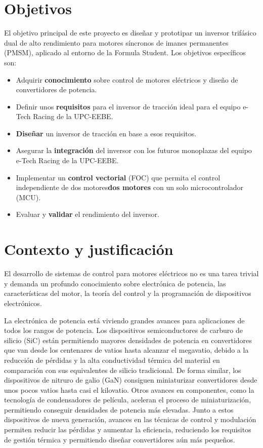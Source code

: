 \section{Objetivos}
El objetivo principal de este proyecto es diseñar y prototipar un inversor trifásico dual de alto rendimiento para motores síncronos de imanes permanentes (PMSM), aplicado al entorno de la Formula Student. Los objetivos específicos son:

\begin{itemize}
	\item Adquirir \textbf{conocimiento} sobre control de motores eléctricos y diseño de convertidores de potencia.
	\item Definir unos \textbf{requisitos} para el inversor de tracción ideal para el equipo e-Tech Racing de la UPC-EEBE.
	\item \textbf{Diseñar} un inversor de tracción en base a esos requisitos.
	\item Asegurar la \textbf{integración} del inversor con los futuros monoplazas del equipo e-Tech Racing de la UPC-EEBE.
	\item Implementar un \textbf{control vectorial} (FOC) que permita el control independiente de dos motores\textbf{dos motores} con un solo microcontrolador (MCU).
	\item Evaluar y \textbf{validar} el rendimiento del inversor.
\end{itemize}

\section{Contexto y justificación}

El desarrollo de sistemas de control para motores eléctricos no es una tarea trivial y demanda un profundo conocimiento sobre electrónica de potencia, las características del motor, la teoría del control y la programación de dispositivos electrónicos.

La electrónica de potencia está viviendo grandes avances para aplicaciones de todos los rangos de potencia. Los dispositivos semiconductores de carburo de silicio (SiC) están permitiendo mayores densidades de potencia en convertidores que van desde los centenares de vatios hasta alcanzar el megavatio, debido a la reducción de pérdidas y la alta conductividad térmica del material en comparación con sus equivalentes de silicio tradicional. De forma similar, los dispositivos de nitruro de galio (GaN) consiguen miniaturizar convertidores desde unos pocos vatios hasta casi el kilovatio. Otros avances en componentes, como la tecnología de condensadores de película, aceleran el proceso de miniaturización, permitiendo conseguir densidades de potencia más elevadas. Junto a estos dispositivos de nueva generación, avances en las técnicas de control y modulación permiten reducir las pérdidas y aumentar la eficiencia, reduciendo los requisitos de gestión térmica y permitiendo diseñar convertidores aún más pequeños.

